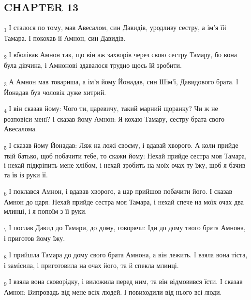 \subsection{CHAPTER 13}
\begin{tcolorbox}
\textsubscript{1} І сталося по тому, мав Авесалом, син Давидів, уродливу сестру, а ім'я їй Тамара. І покохав її Амнон, син Давидів.
\end{tcolorbox}
\begin{tcolorbox}
\textsubscript{2} І вболівав Амнон так, що він аж захворів через свою сестру Тамару, бо вона була дівчина, і Амнонові здавалося трудно щось їй зробити.
\end{tcolorbox}
\begin{tcolorbox}
\textsubscript{3} А Амнон мав товариша, а ім'я йому Йонадав, син Шім'ї, Давидового брата. І Йонадав був чоловік дуже хитрий.
\end{tcolorbox}
\begin{tcolorbox}
\textsubscript{4} І він сказав йому: Чого ти, царевичу, такий марний щоранку? Чи ж не розповіси мені? І сказав йому Амнон: Я кохаю Тамару, сестру брата свого Авесалома.
\end{tcolorbox}
\begin{tcolorbox}
\textsubscript{5} І сказав йому Йонадав: Ляж на ложі своєму, і вдавай хворого. А коли прийде твій батько, щоб побачити тебе, то скажи йому: Нехай прийде сестра моя Тамара, і нехай підкріпить мене хлібом, і нехай зробить на моїх очах ту їжу, щоб я бачив та їв із руки її.
\end{tcolorbox}
\begin{tcolorbox}
\textsubscript{6} І поклався Амнон, і вдавав хворого, а цар прийшов побачити його. І сказав Амнон до царя: Нехай прийде сестра моя Тамара, і нехай спече на моїх очах два млинці, і я попоїм з її руки.
\end{tcolorbox}
\begin{tcolorbox}
\textsubscript{7} І послав Давид до Тамари, до дому, говорячи: Іди до дому твого брата Амнона, і приготов йому їжу.
\end{tcolorbox}
\begin{tcolorbox}
\textsubscript{8} І прийшла Тамара до дому свого брата Амнона, а він лежить. І взяла вона тіста, і замісила, і приготовила на очах його, та й спекла млинці.
\end{tcolorbox}
\begin{tcolorbox}
\textsubscript{9} І взяла вона сковорідку, і виложила перед ним, та він відмовився їсти. І сказав Амнон: Випровадь від мене всіх людей. І повиходили від нього всі люди.
\end{tcolorbox}
